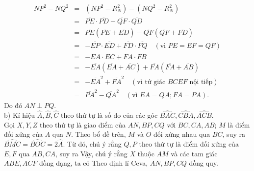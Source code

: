 \begin{bt}
{{\begin{eqnarray*}
NP^2-NQ^2 &=& (NP^2-R_N^2)-(NQ^2-R_N^2)\\
&=& \overline{PE}\cdot\overline{PD} -\overline{QF}\cdot\overline{QD}\\
&=& \overline{PE}(\overline{PE}+\overline{ED}) -\overline{QF}(\overline{QF}+\overline{FD})\\
&=& -\overline{EP}\cdot\overline{ED} +\overline{FD}\cdot\overline{FQ}\quad (\text{vì $PE=EF=QF$})\\
&=& -\overline{EA}\cdot\overline{EC} +\overline{FA}\cdot\overline{FB}\\
&=& -\overline{EA}(\overline{EA}+\overline{AC}) +\overline{FA}(\overline{FA}+\overline{AB})\\
&=& -\overline{EA}^2+\overline{FA}^2 \quad (\text{vì tứ giác $BCEF$ nội tiếp})\\
&=& \overline{PA}^2-\overline{QA}^2 \quad (\text{vì $EA=QA; FA=PA$}).
\end{eqnarray*}}
Do đó $AN\perp PQ$.\\
b) Kí hiệu $\widehat{A},\widehat{B},\widehat{C}$ theo thứ tự là số đo của các góc $\widehat{BAC},\widehat{CBA},\widehat{ACB}$.\\
Gọi $X,Y,Z$ theo thứ tự là giao điểm của $AN,BP,CQ$ với $BC,CA,AB$; $M$ là điểm đối xứng của $A$ qua $N$. Theo bổ đề trên, $M$ và $O$ đối xứng nhau qua $BC$, suy ra $\widehat{BMC}=\widehat{BOC}=2\widehat{A}$. Từ đó, chú ý rằng $Q,P$ theo thứ tự là điểm đối xứng của $E,F$ qua $AB,CA$, suy ra
Vậy, chú ý rằng $X$ thuộc $AM$ và các tam giác $ABE,ACF$ đồng dạng, ta có 
Theo định lí Ceva, $AN,BP,CQ$ đồng quy.
}
\end{bt}




